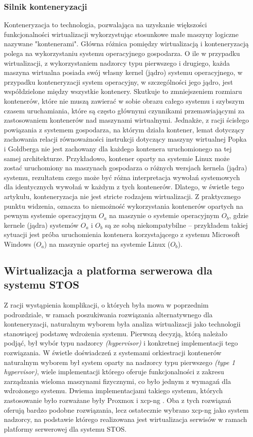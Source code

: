 \subsubsection{Silnik konteneryzacji}
Konteneryzacja to technologia, pozwalająca na uzyskanie większości funkcjonalności wirtualizacji wykorzystując stosunkowe małe maszyny logiczne nazywane "kontenerami". Główna różnica pomiędzy wirtualizacją i konteneryzacją polega na wykorzystaniu systemu operacyjnego gospodarza. O ile w przypadku wirtualizacji, z wykorzystaniem nadzorcy typu pierwszego i drugiego, każda maszyna wirtualna posiada swój własny kernel (jądro) systemu operacyjnego, w przypadku konteneryzacji system operacyjny, w szczególności jego jądro, jest współdzielone między wszystkie kontenery. Skutkuje to zmniejszeniem rozmiaru kontenerów, które nie muszą zawierać w sobie obrazu całego systemu i szybszym czasem uruchamiania, które są często głównymi czynnikami przemawiającymi za zastosowaniem kontenerów nad maszynami wirtualnymi. Jednakże, z racji ścisłego powiązania z systemem gospodarza, na którym działa kontener, lemat dotyczący zachowania relacji równoważności instrukcji dotyczący maszyny wirtualnej Popka i Goldberga \cite{virtualization} nie jest zachowany dla każdego kontenera uruchomionego na tej samej architekturze. Przykładowo, kontener oparty na systemie Linux może zostać uruchomiony na maszynach gospodarza o różnych wersjach kernela (jądra) systemu, rezultatem czego może być różna interpretacja wywołań systemowych dla identycznych wywołań w każdym z tych kontenerów. Dlatego, w świetle tego artykułu, konteneryzacja nie jest stricte rodzajem wirtualizacji. Z praktycznego punktu widzenia, oznacza to niemożność wykorzystania kontenerów opartych na pewnym systemie operacyjnym $O_a$ na maszynie o systemie operacyjnym $O_b$, gdzie kernele (jądra) systemów $O_a$ i $O_b$ są ze sobą niekompatybilne -- przykładem takiej sytuacji jest próba uruchomienia kontenera korzystającego z systemu Microsoft Windows ($O_a$) na maszynie opartej na systemie Linux ($O_b$).

\subsection{Wirtualizacja a platforma serwerowa dla systemu STOS}
Z racji wystąpienia komplikacji, o których była mowa w poprzednim podrozdziale, w ramach poszukiwania rozwiązania alternatywnego dla konteneryzacji, naturalnym wyborem była analiza wirtualizacji jako technologii stanowiącej podstawę wdrożenia systemu. Pierwszą decyzją, którą należało podjąć, był wybór typu nadzorcy \textit{(hypervisor)} i konkretnej implementacji tego rozwiązania. W świetle doświadczeń z systemami orkiestracji kontenerów naturalnym wyborem był system oparty na nadzorcy typu pierwszego \textit{(type 1 hypervisor)}, wiele implementacji którego oferuje funkcjonalności z zakresu zarządzania wieloma maszynami fizycznymi, co było jednym z wymagań dla wdrożonego systemu. Dwiema implementacjami takiego systemu, których zastosowanie było rozważane były Proxmox i xcp-ng \cite{proxmox, xcp}. Oba z tych rozwiązań oferują bardzo podobne rozwiązania, lecz ostatecznie wybrano xcp-ng jako system nadzorcy, na podstawie którego realizowana jest wirtualizacja serwisów w ramach platformy serwerowej dla systemu STOS.
